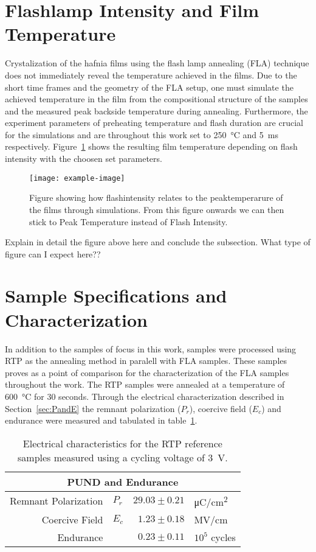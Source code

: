 \documentclass[11pt,twoside]{eitExjobb}
\begin{document}
\section{Flashlamp Intensity and Film Temperature}
Crystalization of the hafnia films using the flash lamp annealing (FLA) technique does not immediately reveal the temperature achieved in the films. Due to the short time frames and the geometry of the FLA setup, one must simulate the achieved temperature in the film from the compositional structure of the samples and the measured peak backside temperature during annealing. Furthermore, the experiment parameters of preheating temperature and flash duration are crucial for the simulations and are throughout this work set to \SI{250}{\celsius} and \SI{5}{\milli\second} respectively. Figure~\ref{fig:res_ComsolSim} shows the resulting film temperature depending on flash intensity with the choosen set parameters.
    
\begin{figure}[htbp]
    \centering
    \texttt{[image: example-image]}
    \caption{Figure showing how flashintensity relates to the peaktemperarure of the films through simulations. From this figure onwards we can then stick to Peak Temperature instead of Flash Intensity.}\label{fig:res_ComsolSim}
\end{figure}

Explain in detail the figure above here and conclude the subsection. What type
of figure can I expect here??

\section{Sample Specifications and Characterization}
In addition to the samples of focus in this work, samples were processed using RTP as the annealing method in paralell with FLA samples. These samples proves as a point of comparison for the characterization of the FLA samples throughout the work. The RTP samples were annealed at a temperature of \SI{600}{\celsius} for 30 seconds. Through the electrical characterization described in Section~\ref{sec:PandE} the remnant polarization ($P_r$), coercive field ($E_c$) and endurance were measured and tabulated in table~\ref{tab:RTPref}.

\begin{table}[htbp]
    \centering
    \caption{Electrical characteristics for the RTP reference samples measured using a cycling voltage of \SI{3}{\volt}.}\label{tab:RTPref}
    \begin{tabular}{rlrl}
        \toprule
        \multicolumn{4}{c}{PUND and Endurance}\\\midrule
        Remnant Polarization & $P_r$ & $29.03 \pm 0.21$ & \si{\micro\coulomb/\centi\meter^2}\\
        Coercive Field & $E_c$ & $1.23 \pm 0.18$ & \si{\mega\volt/\centi\meter}\\
        Endurance & & $0.23 \pm 0.11$ & $10^5$ cycles\\\bottomrule
    \end{tabular}
\end{table}
\end{document}

